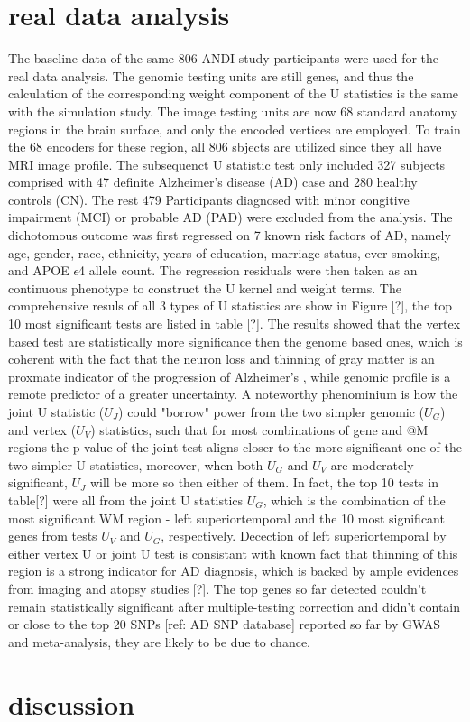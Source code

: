 \documentclass[twocolumn]{article}
\begin{document}
\section{real data analysis}
The baseline data of the same 806 ANDI study participants were used for the real data analysis. The genomic testing units are still genes, and thus the calculation of the corresponding weight component of the U statistics is the same with the simulation study. The image testing units are now 68 standard anatomy regions in the brain surface, and only the encoded vertices are employed. To train the 68 encoders for these region, all 806 sbjects are utilized since they all have MRI image profile. The subsequenct U statistic test only included 327 subjects comprised with 47 definite Alzheimer's disease (AD) case and 280 healthy controls (CN). The rest 479 Participants diagnosed with minor congitive impairment (MCI) or probable AD (PAD) were excluded from the analysis. The dichotomous outcome was first regressed on 7 known risk factors of AD, namely age, gender, race, ethnicity, years of education, marriage status, ever smoking, and APOE $\epsilon$4 allele count. The regression residuals were then taken as an continuous phenotype to construct the U kernel and weight terms. The comprehensive resuls of all 3 types of U statistics are show in Figure [?], the top 10 most significant tests are listed in table [?]. 
The results showed that the vertex based test are statistically more significance then the genome based ones, which is coherent with the fact that the neuron loss and thinning of gray matter is an proxmate indicator of the progression of Alzheimer's , while genomic profile is a remote predictor of a greater uncertainty. A noteworthy phenominium is how the joint U statistic ($U_J$) could "borrow" power from the two simpler genomic ($U_G$) and vertex ($U_V$) statistics, such that for most combinations of gene and @M regions the p-value of the joint test aligns closer to the more significant one of the two simpler U statistics, moreover, when both $U_G$ and $U_V$ are moderately significant, $U_J$ will be more so then either of them. In fact, the top 10 tests in table[?] were all from the joint U statistics $U_G$, which is the combination of the most significant WM region - left superiortemporal and the 10 most significant genes from tests $U_V$ and $U_G$, respectively. Decection of left superiortemporal by either vertex U or joint U test is consistant with known fact that thinning of this region is a strong indicator for AD diagnosis, which is backed by ample evidences from imaging and atopsy studies [?]. The top genes so far detected couldn't remain statistically significant after multiple-testing correction and didn't contain or close to the top 20 SNPs [ref: AD SNP database] reported so far by GWAS and meta-analysis, they are likely to be due to chance. 

\section{discussion}


\end{document}
